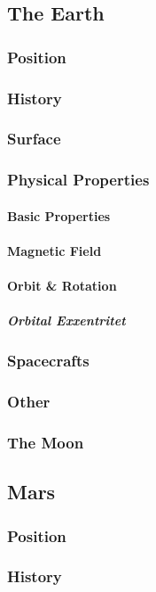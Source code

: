 \subsection{The Earth}
\label{planet:earth}
\subsubsection{Position}
\subsubsection{History}
\subsubsection{Surface}
\subsubsection{Physical Properties}
\paragraph{Basic Properties}
\paragraph{Magnetic Field}
\paragraph{Orbit \& Rotation}
\subparagraph{Orbital Exxentritet}
\subsubsection{Spacecrafts}
\subsubsection{Other}
\subsubsection{The Moon}
\label{planet:earth:moon}
\subsection{Mars}
\subsubsection{Position}
\subsubsection{History}
